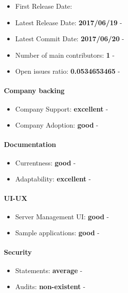 \documentclass{article}
\begin{document}
\begin{itemize}
\item First Release Date: 
\item Latest Release Date: \textbf{2017/06/19} - 
\item Latest Commit Date: \textbf{2017/06/20} - 
\item Number of main contributors: \textbf{1} - 
\item Open issues ratio: \textbf{0.0534653465} - 
\end{itemize}

\paragraph{Company backing}

\begin{itemize}
\item Company Support: \textbf{excellent} - 
\item Company Adoption: \textbf{good} - 
\end{itemize}

\paragraph{Documentation}

\begin{itemize}
\item Currentness: \textbf{good} - 
\item Adaptability: \textbf{excellent} - 
\end{itemize}

\paragraph{UI-UX}

\begin{itemize}
\item Server Management UI: \textbf{good} - 
\item Sample applications: \textbf{good} - 
\end{itemize}

\paragraph{Security} 

\begin{itemize}
\item Statements: \textbf{average} - 
\item Audits: \textbf{non-existent} - 
\end{itemize}
\end{document}
